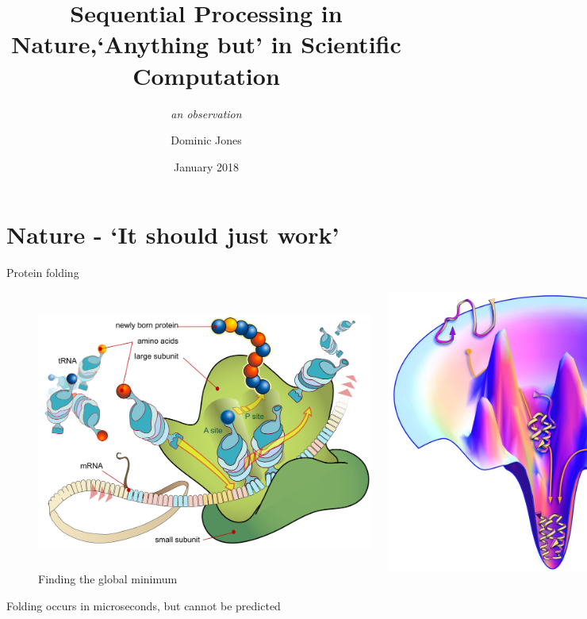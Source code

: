 \documentclass[xcolor=dvipsnames]{beamer}
\title{Sequential Processing in Nature,\newline `Anything but' in Scientific Computation}
\subtitle{\emph{an observation}}
\author{Dominic Jones}
\institute{Netherhall House, London}
\date{January 2018}
\begin{document}
\begin{frame}[plain]
  \titlepage
\end{frame}


\section{Nature - `It should just work'}


\begin{frame}{Protein folding}
\begin{figure}
  \centering
  \begin{columns}
    \centering
    \caption {Synthesising the chain}
    \includegraphics[width=0.99\textwidth]{protein_synthesis}
    \centering
    \caption {Finding the global minimum}
    \includegraphics[width=0.99\textwidth]{protein_energy_state}
  \end{columns}
\end{figure}
Folding occurs in microseconds, but cannot be predicted
\end{frame}
\end{document}
